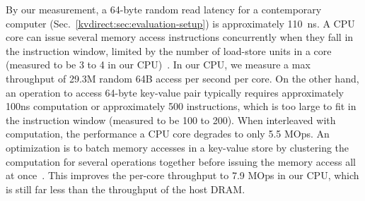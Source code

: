 {By our measurement, a 64-byte random read latency for a contemporary computer (Sec.~\ref{kvdirect:sec:evaluation-setup}) is approximately 110~ns. A CPU core can issue several memory access instructions concurrently when they fall in the instruction window, limited by the number of load-store units in a core (measured to be 3 to 4 in our CPU)~\cite{gharachorloo1992hiding, han2010packetshader, zhang2015mega}. In our CPU, we measure a max throughput of 29.3M random 64B access per second per core. On the other hand, an operation to access 64-byte key-value pair typically requires approximately 100ns computation or approximately 500 instructions, which is too large to fit in the instruction window (measured to be 100 to 200). When interleaved with computation, the performance a CPU core degrades to only 5.5 MOps. An optimization is to batch memory accesses in a key-value store by clustering the computation for several operations together before issuing the memory access all at once~\cite{li2016full, narula2014phase}. This improves the per-core throughput to 7.9 MOps in our CPU, which is still far less than the throughput of the host DRAM. 


\begin{comment}
When pushed to the limit, in high performance key-value storage systems the throughput bottleneck can be attributed to the computation in key-value operation and the latency in random memory access. This is actually the bottleneck we want to remove in our design and we discuss the issue here in more detail. 

Key-value storage needs to spend CPU cycles for key comparison and hash slot computation. Moreover, key-value storage hash table is orders of magnitude larger than the CPU cache, therefore the memory access latency is dominated by cache miss latency for practical access patterns.

The latency for CPU to access DRAM on the same NUMA node, \ie cache miss latency, is 80\approx90 nanoseconds on our platform (measured with~\cite{intelmemaccess}, hardware details in sec. \ref{kvdirect:sec:implementation}).
For 64-byte access granularity, the random read latency including data copy is \approx110~ns.
This latency can be partially hidden by the out-of-order execution engine in modern CPUs, which can issue a few memory accesses in parallel.
However, the parallelism is limited by two factors: the number of load-store units (LSUs) per core~\emph{k} (measured to be 3\approx4 on our CPU) and the instruction window size~\emph{W} (measured to be 100\approx200 instructions on our CPU)~\cite{gharachorloo1992hiding, han2010packetshader, zhang2015mega}. When there are enough memory operations in the instruction window, \emph{k} of them can be issued simultaneously. 


\end{comment}}
